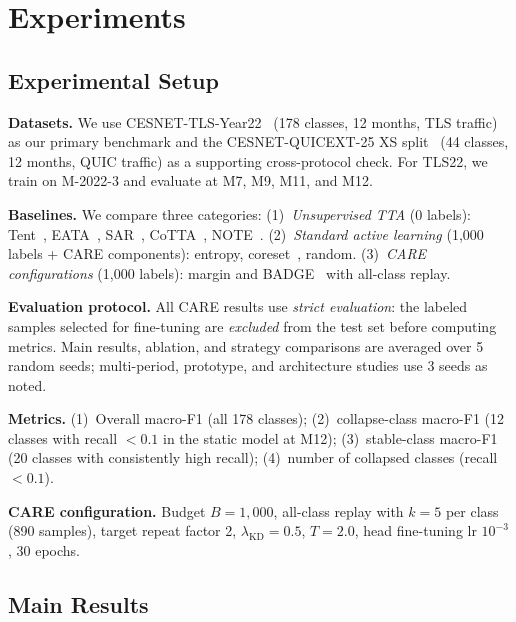 \documentclass[journal]{IEEEtran}
\newcommand{\ours}{CARE}  %
\begin{document}
\section{Experiments}
\label{sec:experiments}

\subsection{Experimental Setup}
\label{sec:exp_setup}

\textbf{Datasets.}
We use CESNET-TLS-Year22~\cite{hynek2024cesnet} (178 classes, 12 months, TLS traffic) as our primary benchmark and the CESNET-QUICEXT-25 XS split~\cite{cesnetquicext25} (44 classes, 12 months, QUIC traffic) as a supporting cross-protocol check.
For TLS22, we train on M-2022-3 and evaluate at M7, M9, M11, and M12.

\textbf{Baselines.}
We compare three categories:
(1)~\textit{Unsupervised TTA} (0 labels): Tent~\cite{wang2021tent}, EATA~\cite{niu2022eata}, SAR~\cite{niu2023sar}, CoTTA~\cite{wang2022cotta}, NOTE~\cite{gong2022note}.
(2)~\textit{Standard active learning} (1{,}000 labels + \ours{} components): entropy, coreset~\cite{sener2018coreset}, random.
(3)~\textit{\ours{} configurations} (1{,}000 labels): margin and BADGE~\cite{ash2020badge} with all-class replay.

\textbf{Evaluation protocol.}
All \ours{} results use \textit{strict evaluation}: the labeled samples selected for fine-tuning are \textit{excluded} from the test set before computing metrics.
Main results, ablation, and strategy comparisons are averaged over 5 random seeds; multi-period, prototype, and architecture studies use 3 seeds as noted.

\textbf{Metrics.}
(1)~Overall macro-F1 (all 178 classes);
(2)~collapse-class macro-F1 (12 classes with recall ${<}0.1$ in the static model at M12);
(3)~stable-class macro-F1 (20 classes with consistently high recall);
(4)~number of collapsed classes (recall ${<}0.1$).

\textbf{\ours{} configuration.}
Budget $B{=}1{,}000$, all-class replay with $k{=}5$ per class (890 samples), target repeat factor 2, $\lambda_{\text{KD}}{=}0.5$, $T{=}2.0$, head fine-tuning lr $10^{-3}$, 30 epochs.

\subsection{Main Results}
\label{sec:main_results}
\end{document}
